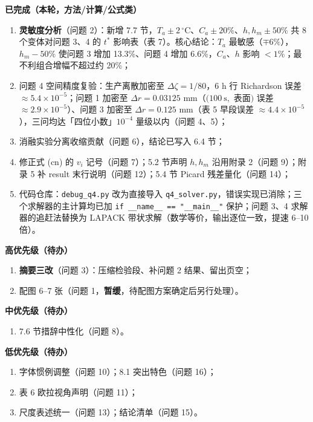\documentclass[12pt,a4paper]{ctexart}
\begin{document}
\textbf{已完成（本轮，方法/计算/公式类）}
\begin{enumerate}[label=(\arabic*),leftmargin=3em]
\item \textbf{灵敏度分析}（问题 2）：新增 7.7 节，$T_a\pm2\,^\circ$C、$C_a\pm20\%$、$h,h_m\pm50\%$ 共 8 个变体对问题 3、4 的 $t^*$ 影响表（表 7）。核心结论：$T_a$ 最敏感（$\mp6\%$），$h_m-50\%$ 使问题 3 增加 13.3\%、问题 4 增加 6.6\%，$C_a$、$h$ 影响 $<1\%$；最不利组合增幅不超过约 20\%；
\item 问题 4 空间精度复验：生产离散加密至 $\Delta\zeta=1/80$，6 h 行 Richardson 误差 $\approx5.4\times10^{-5}$；问题 1 加密至 $\Delta r=0.03125$ mm（$(100\ \mathrm{s},$ 表面$)$ 误差 $\approx2.9\times10^{-5}$）、问题 3 加密至 $\Delta r=0.125$ mm（表 5 早段误差 $\approx4.4\times10^{-5}$），三问均达「四位小数」$10^{-4}$ 量级以内（问题 4、5）；
\item 消融实验分离收缩贡献（问题 6），结论已写入 6.4 节；
\item 修正式 (cn) 的 $v_i$ 记号（问题 7）；5.2 节声明 $h,h_m$ 沿用附录 2（问题 9）；附录 5 补 result 末行说明（问题 12）；5.4 节 Picard 残差量化（问题 14）；
\item 代码仓库：\texttt{debug\_q4.py} 改为直接导入 \texttt{q4\_solver.py}，错误实现已消除；三个求解器的主计算均已加 \texttt{if \_\_name\_\_ == "\_\_main\_\_"} 保护；问题 3、4 求解器的追赶法替换为 LAPACK 带状求解（数学等价，输出逐位一致，提速 6--10 倍）。
\end{enumerate}

\textbf{高优先级（待办）}
\begin{enumerate}[label=(\arabic*),leftmargin=3em]
\item \textbf{摘要三改}（问题 3）：压缩检验段、补问题 2 结果、留出页空；
\item 配图 6--7 张（问题 1，\textbf{暂缓}，待配图方案确定后另行处理）。
\end{enumerate}

\textbf{中优先级（待办）}
\begin{enumerate}[label=(\arabic*),leftmargin=3em]
\item 7.6 节措辞中性化（问题 8）。
\end{enumerate}

\textbf{低优先级（待办）}
\begin{enumerate}[label=(\arabic*),leftmargin=3em]
\item 字体惯例调整（问题 10）；8.1 突出特色（问题 16）；
\item 表 6 欧拉视角声明（问题 11）；
\item 尺度表述统一（问题 13）；结论清单（问题 15）。
\end{enumerate}
\end{document}
